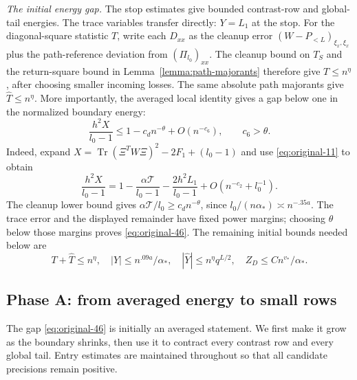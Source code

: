 \par\smallskip\noindent
\textit{The initial energy gap.}
The stop estimates give bounded contrast-row and global-tail energies.
The trace variables transfer directly: $Y=L_1$ at the stop.  For the
diagonal-square statistic $T$, write each $D_{xx}$ as the cleanup
error $(W-P_{<L})_{\xi_x,\xi_x}$ plus the path-reference deviation
from $(\Pi_{l_0})_{xx}$.  The cleanup bound on $T_S$ and the
return-square bound in Lemma~\ref{lemma:path-majorants} therefore
give $T\le n^\eta$, after choosing smaller incoming losses.
The same absolute path majorants give $\widehat T\le n^\eta$.
More importantly, the averaged local identity gives a gap below one in
the normalized boundary energy:
\begin{equation}
 \frac{h^2X}{l_0-1}
 \le1-c_dn^{-\theta}+O(n^{-c_6}),\qquad c_6>\theta.
 \label{eq:original-46}
\end{equation}
Indeed, expand
$X=\operatorname{Tr}(\Xi^TW\Xi)^2-2F_1+(l_0-1)$ and use
\eqref{eq:original-11} to obtain
\[
 \frac{h^2X}{l_0-1}
 =1-\frac{\alpha\mathcal T}{l_0-1}
    -\frac{2h^2L_1}{l_0-1}
    +O(n^{-c_2}+l_0^{-1}).
\]
The cleanup lower bound gives
$\alpha\mathcal T/l_0\ge c_dn^{-\theta}$, since
$l_0/(n\alpha_*)\asymp n^{-.35a}$.
The trace error and the displayed remainder have fixed power margins;
choosing $\theta$ below those margins proves \eqref{eq:original-46}.
The remaining initial bounds needed below are
\[
 T+\widehat T\le n^\eta,\quad
 |Y|\le n^{.09a}/\alpha_*,\quad
 |\widehat Y|\le n^\eta q^{L/2},\quad
 Z_D\le Cn^{v_*}/\alpha_*.
\]

\subsection{Phase A: from averaged energy to small rows}
\label{subsec:boundary-phase-a}

The gap \eqref{eq:original-46} is initially an averaged statement.  We
first make it grow as the boundary shrinks, then use it to contract every
contrast row and every global tail.  Entry estimates are maintained
throughout so that all candidate precisions remain positive.

